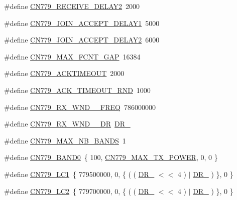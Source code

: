 \begin{DoxyCompactItemize}
\#define \hyperlink{group__REGIONCN779_ga40b53070cc108b1704c23fd196bc1a02}{C\+N779\+\_\+\+R\+E\+C\+E\+I\+V\+E\+\_\+\+D\+E\+L\+A\+Y2}~2000
\item 
\#define \hyperlink{group__REGIONCN779_gae35de851225832e6fce8edbd9cc87e35}{C\+N779\+\_\+\+J\+O\+I\+N\+\_\+\+A\+C\+C\+E\+P\+T\+\_\+\+D\+E\+L\+A\+Y1}~5000
\item 
\#define \hyperlink{group__REGIONCN779_gaba22c62202d5f40c7c952706604f961b}{C\+N779\+\_\+\+J\+O\+I\+N\+\_\+\+A\+C\+C\+E\+P\+T\+\_\+\+D\+E\+L\+A\+Y2}~6000
\item 
\#define \hyperlink{group__REGIONCN779_ga6bac9924ad75dba200876f5ddcb8d91e}{C\+N779\+\_\+\+M\+A\+X\+\_\+\+F\+C\+N\+T\+\_\+\+G\+AP}~16384
\item 
\#define \hyperlink{group__REGIONCN779_gaf4edb86dfa6b0c55d43f183399b36878}{C\+N779\+\_\+\+A\+C\+K\+T\+I\+M\+E\+O\+UT}~2000
\item 
\#define \hyperlink{group__REGIONCN779_gaead3d649c05b0529d19d2fd1994f1d93}{C\+N779\+\_\+\+A\+C\+K\+\_\+\+T\+I\+M\+E\+O\+U\+T\+\_\+\+R\+ND}~1000
\item 
\#define \hyperlink{group__REGIONCN779_ga055b0718f7cc4056fc467f5abe971d8c}{C\+N779\+\_\+\+R\+X\+\_\+\+W\+N\+D\+\_\+\_\+\+F\+R\+EQ}~786000000
\item 
\#define \hyperlink{group__REGIONCN779_gac242b7599d5234bc866206a447d8c517}{C\+N779\+\_\+\+R\+X\+\_\+\+W\+N\+D\+\_\+\_\+\+DR}~\hyperlink{group__REGION_ga6c4ef966b4f3d5eb7597b087f2b97095}{D\+R\+\_}
\item 
\#define \hyperlink{group__REGIONCN779_ga605a78b9ce2c56ef5d320e029e369236}{C\+N779\+\_\+\+M\+A\+X\+\_\+\+N\+B\+\_\+\+B\+A\+N\+DS}~1
\item 
\#define \hyperlink{group__REGIONCN779_ga428819be1d6f97028be344a4bf8dff3e}{C\+N779\+\_\+\+B\+A\+N\+D0}~\{ 100, \hyperlink{group__REGIONCN779_ga8a70356561f3416db21a1e93b4ee4ae9}{C\+N779\+\_\+\+M\+A\+X\+\_\+\+T\+X\+\_\+\+P\+O\+W\+ER}, 0,  0 \}
\item 
\#define \hyperlink{group__REGIONCN779_ga1318d698c85f15c35bd4953830d5df48}{C\+N779\+\_\+\+L\+C1}~\{ 779500000, 0, \{ ( ( \hyperlink{group__REGION_ga872e12c82020c02a7f70a1c6ed1375df}{D\+R\+\_} $<$$<$ 4 ) $\vert$ \hyperlink{group__REGION_ga6c4ef966b4f3d5eb7597b087f2b97095}{D\+R\+\_} ) \}, 0 \}
\item 
\#define \hyperlink{group__REGIONCN779_ga758c5da7fe1372388ab9476835b4b4d2}{C\+N779\+\_\+\+L\+C2}~\{ 779700000, 0, \{ ( ( \hyperlink{group__REGION_ga872e12c82020c02a7f70a1c6ed1375df}{D\+R\+\_} $<$$<$ 4 ) $\vert$ \hyperlink{group__REGION_ga6c4ef966b4f3d5eb7597b087f2b97095}{D\+R\+\_} ) \}, 0 \}

\end{DoxyCompactItemize}
